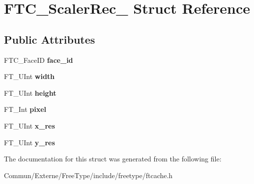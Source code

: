 \hypertarget{struct_f_t_c___scaler_rec__}{}\section{F\+T\+C\+\_\+\+Scaler\+Rec\+\_\+ Struct Reference}
\label{struct_f_t_c___scaler_rec__}
\subsection*{Public Attributes}
\begin{DoxyCompactItemize}
\item 
F\+T\+C\+\_\+\+Face\+ID {\bfseries face\+\_\+id}\hypertarget{struct_f_t_c___scaler_rec___a8e963aa619409e646558fe7aa272e81f}{}\label{struct_f_t_c___scaler_rec___a8e963aa619409e646558fe7aa272e81f}

\item 
F\+T\+\_\+\+U\+Int {\bfseries width}\hypertarget{struct_f_t_c___scaler_rec___a11e13d907ca4661bf7c1d98fffecf321}{}\label{struct_f_t_c___scaler_rec___a11e13d907ca4661bf7c1d98fffecf321}

\item 
F\+T\+\_\+\+U\+Int {\bfseries height}\hypertarget{struct_f_t_c___scaler_rec___a9b3a9b4d7148bbaa4daaae1e1fbb2dbc}{}\label{struct_f_t_c___scaler_rec___a9b3a9b4d7148bbaa4daaae1e1fbb2dbc}

\item 
F\+T\+\_\+\+Int {\bfseries pixel}\hypertarget{struct_f_t_c___scaler_rec___ab78868341e2d66f17e6f1d77e9e054d2}{}\label{struct_f_t_c___scaler_rec___ab78868341e2d66f17e6f1d77e9e054d2}

\item 
F\+T\+\_\+\+U\+Int {\bfseries x\+\_\+res}\hypertarget{struct_f_t_c___scaler_rec___a886c7c1230dc5d5e6b3fc32d06274752}{}\label{struct_f_t_c___scaler_rec___a886c7c1230dc5d5e6b3fc32d06274752}

\item 
F\+T\+\_\+\+U\+Int {\bfseries y\+\_\+res}\hypertarget{struct_f_t_c___scaler_rec___accb53c7a9aeebb41c05f48d14d3dfe71}{}\label{struct_f_t_c___scaler_rec___accb53c7a9aeebb41c05f48d14d3dfe71}

\end{DoxyCompactItemize}


The documentation for this struct was generated from the following file\+:\begin{DoxyCompactItemize}
\item 
Commun/\+Externe/\+Free\+Type/include/freetype/ftcache.\+h\end{DoxyCompactItemize}
